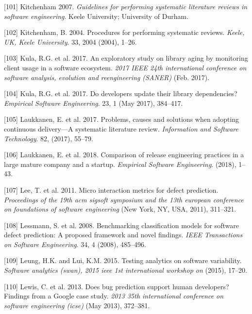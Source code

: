 \documentclass[]{book}
\begin{document}
\hypertarget{ref-kitchenham2007}{}
{[}101{]} Kitchenham 2007. \emph{Guidelines for performing systematic
literature reviews in software engineering}. Keele University;
University of Durham.

\hypertarget{ref-kitchenham2004procedures}{}
{[}102{]} Kitchenham, B. 2004. Procedures for performing systematic
reviews. \emph{Keele, UK, Keele University}. 33, 2004 (2004), 1--26.

\hypertarget{ref-Kula2017-2}{}
{[}103{]} Kula, R.G. et al. 2017. An exploratory study on library aging
by monitoring client usage in a software ecosystem. \emph{2017 IEEE 24th
international conference on software analysis, evolution and
reengineering (SANER)} (Feb. 2017).

\hypertarget{ref-Kula2017}{}
{[}104{]} Kula, R.G. et al. 2017. Do developers update their library
dependencies? \emph{Empirical Software Engineering}. 23, 1 (May 2017),
384--417.

\hypertarget{ref-laukkanen2017a}{}
{[}105{]} Laukkanen, E. et al. 2017. Problems, causes and solutions when
adopting continuous delivery---A systematic literature review.
\emph{Information and Software Technology}. 82, (2017), 55--79.

\hypertarget{ref-laukkanen2018a}{}
{[}106{]} Laukkanen, E. et al. 2018. Comparison of release engineering
practices in a large mature company and a startup. \emph{Empirical
Software Engineering}. (2018), 1--43.

\hypertarget{ref-Lee2011}{}
{[}107{]} Lee, T. et al. 2011. Micro interaction metrics for defect
prediction. \emph{Proceedings of the 19th acm sigsoft symposium and the
13th european conference on foundations of software engineering} (New
York, NY, USA, 2011), 311--321.

\hypertarget{ref-Lessman2008}{}
{[}108{]} Lessmann, S. et al. 2008. Benchmarking classification models
for software defect prediction: A proposed framework and novel findings.
\emph{IEEE Transactions on Software Engineering}. 34, 4 (2008),
485--496.

\hypertarget{ref-leung2015testing}{}
{[}109{]} Leung, H.K. and Lui, K.M. 2015. Testing analytics on software
variability. \emph{Software analytics (swan), 2015 ieee 1st
international workshop on} (2015), 17--20.

\hypertarget{ref-Lewis2013}{}
{[}110{]} Lewis, C. et al. 2013. Does bug prediction support human
developers? Findings from a Google case study. \emph{2013 35th
international conference on software engineering (icse)} (May 2013),
372--381.
\end{document}

